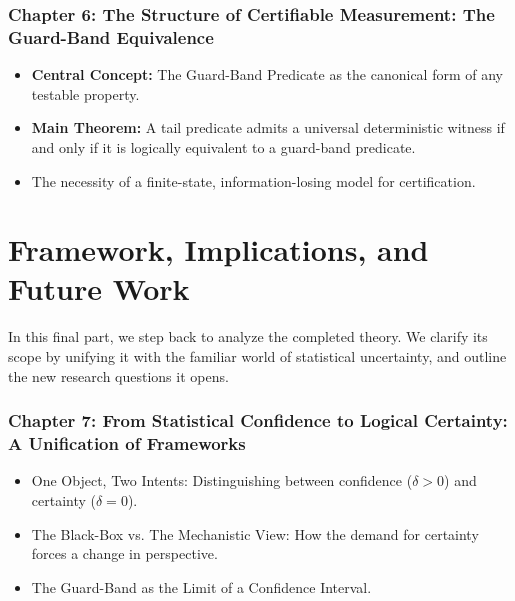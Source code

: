 \documentclass[12pt]{article}
\begin{document}
\section*{Chapter 6: The Structure of Certifiable Measurement: The Guard-Band Equivalence}
\begin{itemize}
    \item \textbf{Central Concept:} The Guard-Band Predicate as the canonical form of any testable property.
    \item \textbf{Main Theorem:} A tail predicate admits a universal deterministic witness if and only if it is logically equivalent to a guard-band predicate.
    \item The necessity of a finite-state, information-losing model for certification.
\end{itemize}

\part{Framework, Implications, and Future Work}

In this final part, we step back to analyze the completed theory. We clarify its scope by unifying it with the familiar world of statistical uncertainty, and outline the new research questions it opens.

\section*{Chapter 7: From Statistical Confidence to Logical Certainty: A Unification of Frameworks}
\begin{itemize}
    \item One Object, Two Intents: Distinguishing between confidence ($\delta > 0$) and certainty ($\delta = 0$).
    \item The Black-Box vs. The Mechanistic View: How the demand for certainty forces a change in perspective.
    \item The Guard-Band as the Limit of a Confidence Interval.
\end{itemize}
\end{document}
